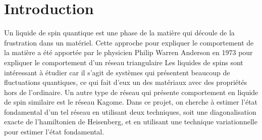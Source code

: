 \documentclass[../main.tex]{subfiles}
\begin{document}
  \section*{Introduction}
  Un liquide de spin quantique est une phase de la matière qui découle de la frustration
  dans un matériel. Cette approche pour expliquer le comportement de la matière
  a été apportée par le physicien Philip Warren Anderson en 1973 pour expliquer
  le comportement d'un réseau triangulaire\cite{ANDERSON1973153}
  Les liquides de spins sont intéressant à étudier car il s'agit de systèmes
  qui présentent beaucoup de fluctuations quantiques, ce qui fait d'eux un des
  matériaux avec des propriétés hors de l'ordinaire.
  Un autre type de réseau qui
  présente comportement en liquide de spin similaire est le réseau Kagome. Dans
  ce projet, on cherche à estimer l'état fondamental d'un tel réseau en utilisant
  deux techniques, soit une diagonalisation exacte de l'hamiltonien de
  Heisenberg, et en utilisant une technique variationnelle pour estimer l'état
  fondamental.
\end{document}
